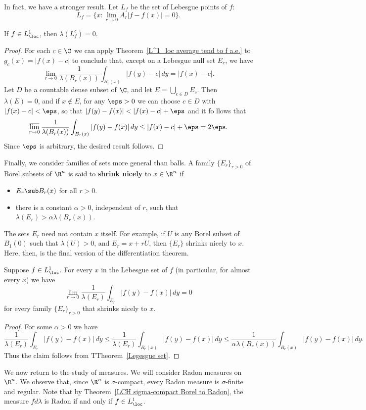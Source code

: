 In fact, we have a stronger result. Let $L_f$ be the set of Lebesgue points of $f$:
\[L_f=\{x:\lim_{r\to 0}A_r|f-f(x)|=0\}.\]
\begin{theorem}\label{Legesgue set}
If $f\in L^1_{\loc}$, then $\lambda(L_f^c)=0$.
\end{theorem}
\begin{proof}
For each $c\in\C$ we can apply Theorem~\ref{L^1_loc average tend to f a.e.} to $g_c(x)=|f(x)-c|$ to conclude that, except on a Lebesgue null set $E_c$, we have
\[\lim_{r\to 0}\frac{1}{\lambda(B_r(x))}\int_{B_r(x)}|f(y)-c|\,dy=|f(x)-c|.\]
Let $D$ be a countable dense subset of $\C$, and let $E=\bigcup_{c\in D}E_c$. Then $\lambda(E)=0$, and if $x\notin E$, for any $\eps>0$ we can choose $c\in D$ with $|f(x)-c|<\eps$, so that $|f(y)-f(x)|<|f(x)-c|+\eps$ and it fo llows that
\[\varlimsup_{r\to 0}\frac{1}{\lambda(B_r(x))}\int_{B_r(x)}|f(y)-f(x)|\,dy\leq |f(x)-c|+\eps=2\eps.\]
Since $\eps$ is arbitrary, the desired result follows.
\end{proof}
Finally, we consider families of sets more general than balls. A family $\{E_r\}_{r>0}$ of Borel subsets of $\R^n$ is said to \textbf{shrink nicely} to $x\in\R^n$ if
\begin{itemize}
\item $E_r\sub B_r(x)$ for all $r>0$.
\item there is a constant $\alpha>0$, independent of $r$, such that $\lambda(E_r)>\alpha\lambda(B_r(x))$.
\end{itemize}
The sets $E_r$ need not contain $x$ itself. For example, if $U$ is any Borel subset of $B_1(0)$ such that $\lambda(U)>0$, and $E_r=x+rU$, then $
\{E_r\}$ shrinks nicely to $x$. Here, then, is the final version of the differentiation theorem.
\begin{theorem}
Suppose $f\in L^1_{\loc}$. For every $x$ in the Lebesgue set of $f$ (in particular, for almost every $x$) we have
\[\lim_{r\to 0}\frac{1}{\lambda(E_r)}\int_{E_r}|f(y)-f(x)|\,dy=0\]
for every family $\{E_r\}_{r>0}$ that shrinks nicely to $x$.
\end{theorem}
\begin{proof}
For some $\alpha>0$ we have
\[\frac{1}{\lambda(E_r)}\int_{E_r}|f(y)-f(x)|\,dy\leq\frac{1}{\lambda(E_r)}\int_{B_r(x)}|f(y)-f(x)|\,dy\leq\frac{1}{\alpha\lambda(B_r(x))}\int_{B_r(x)}|f(y)-f(x)|\,dy.\]
Thus the claim follows from TTheorem~\ref{Legesgue set}.
\end{proof}
We now return to the study of measures. We will consider Radon measures on $\R^n$. We observe that, since $\R^n$ is $\sigma$-compact, every Radon measure is $\sigma$-finite and regular. Note that by Theorem~\ref{LCH sigma-compact Borel to Radon}, the measure $fd\lambda$ is Radon if and only if $f\in L^1_{\loc}$.
